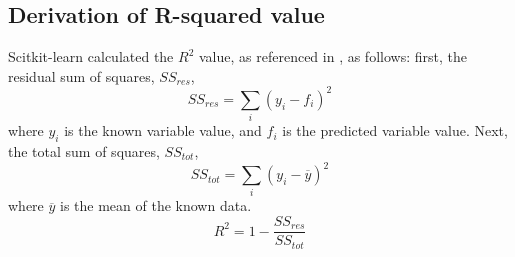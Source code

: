 \documentclass[journal,twoside,web]{ieeecolor}
\begin{document}
\subsection{Derivation of R-squared value}
\label{app:r-squared}
Scitkit-learn calculated the $R^2$ value, as referenced in \cite{b7}, as follows:
first, the residual sum of squares, $SS_{res}$,
\begin{equation}
    \label{eq:ResidSumSquares}
    SS_{res} = \sum_{i}{(y_i-f_i)^2}
\end{equation}
where $y_i$ is the known variable value, and $f_i$ is the predicted variable value.
Next, the total sum of squares, $SS_{tot}$,
\begin{equation}
    \label{eq:TotSumSquares}
    SS_{tot} = \sum_{i}{(y_i-\overline{y})^2}
\end{equation}
where $\overline{y}$ is the mean of the known data.
\begin{equation}
    \label{eq:CoeffDeterm}
    R^2 = 1 - \frac{SS_{res}}{SS_{tot}}
\end{equation}
\end{document}
